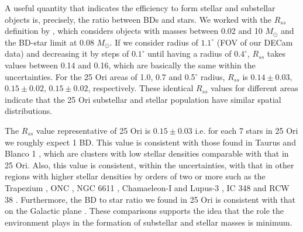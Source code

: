 \documentclass[12pt]{article}
\begin{document}
A useful quantity that indicates the efficiency to form stellar and substellar objects is, precisely, the ratio between BDs and stars. We worked with the $R_{ss}$ definition by \citet{Briceno2002}, which considers objects with masses between 0.02 and 10 $M_\odot$ and the BD-star limit at 0.08 $M_\odot$. If we consider radius of $1.1^\circ$ (FOV of our DECam data) and decreasing it by steps of $0.1^\circ$ until having a radius of $0.4^\circ$, $R_{ss}$ takes values between 0.14 and 0.16, which are basically the same within the uncertainties. For the 25 Ori areas of 1.0, 0.7 and 0.5$^\circ$ radius, $R_{ss}$ is $0.14\pm0.03$, $0.15\pm0.02$, $0.15\pm0.02$, respectively. These identical $R_{ss}$ values for different areas indicate that the 25 Ori substellar and stellar population have similar spatial distributions.

The $R_{ss}$ value representative of 25 Ori is $0.15\pm0.03$ i.e. for each 7 stars in 25 Ori we roughly expect 1 BD. This value is consistent with those found in Taurus \citep{Briceno2002} and Blanco 1 \citep{Moraux2007a}, which are clusters with low stellar densities comparable with that in 25 Ori. Also, this value is consistent, within the uncertainties, with that in other regions with higher stellar densities by orders of two or more such as the Trapezium \citep{Muench2002}, ONC \citep{Kroupa-Bouvier2003}, NGC 6611 \citep{Oliveira2009}, Chamaeleon-I and Lupus-3 \citep{Muzic2015}, IC 348 \citep{Scholz2013} and RCW 38 \citep[as a lower quote; ][]{Muzic2017}. Furthermore, the BD to star ratio we found in 25 Ori is consistent with that on the Galactic plane \citep{Bihain-Scholz2016}. These comparisons supports the idea that the role the environment plays in the formation of substellar and stellar masses is minimum.
\end{document}
